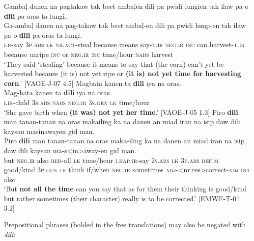 \ea
Gambaļ  danen  na  pagtakaw  tak  beet  ambaļen  dili  pa pwidi  lungien  tak  ilaw  pa  o  \textbf{dili}  pa  oras  ta  lungi. \\\smallskip
\gll Ga-ambaļ  danen  na  pag-takaw  tak  beet  ambaļ-en  dili  pa pwidi  lungi-en  tak  ilaw  pa  o  \textbf{dili}  pa  oras  ta  lungi. \\
\textsc{i.r}-say  3\textsc{p.abs}  \textsc{lk}  \textsc{nr.act}-steal  because  means  say-\textsc{t.ir}  \textsc{neg.ir}  \textsc{inc}
can  harvest-\textsc{t.ir}  because  unripe  \textsc{inc}  or  \textsc{neg.ir}  \textsc{inc}  time/hour  \textsc{nabs}  harvest \\
\glt `They said ‘stealing’ because it means to say that (the corn) can’t yet be harvested because (it is) not yet ripe or \textbf{(it is) not yet time for harvesting corn}.’ [VAOE-J-07 4.5]
\z
\ea
Magbata  kanen  ta  \textbf{dili}  iya  na  oras. \\\smallskip
\gll Mag-bata  kanen  ta  \textbf{dili}  iya  na  oras. \\
\textsc{i.ir}-child  3\textsc{s.abs}  \textsc{nabs}  \textsc{neg.ir}  3\textsc{s.gen}  \textsc{lk}  time/hour \\
\glt ‘She gave birth when \textbf{(it was) not yet her time}.’ [VAOE-J-05 1.3]
\z
\ea
Piro  \textbf{dili}  man  tanan-tanan  na  oras  makailing  ka  na danen  an  miad  iran  na  isip  daw  dili  kaysan masinawayen  gid  man. \\\smallskip
\gll Piro  \textbf{dili}  man  tanan-tanan  na  oras  maka-iling  ka  na danen  an  miad  iran  na  isip  daw  dili  kaysan  ma-s<in>away-en  gid  man. \\
but  \textsc{neg.ir}  also  \textsc{red}-all  \textsc{lk}  time/hour  \textsc{i.hap.ir}-say  2\textsc{s.abs}  \textsc{lk}
3\textsc{p.abs}  \textsc{def.m}  good/kind  3\textsc{p.gen}  \textsc{lk}  think  if/when  \textsc{neg.ir}  sometimes 
\textsc{adj}-\textsc<{nr.res}>correct-\textsc{adj}  \textsc{int}  also \\
\glt `But \textbf{not all the time} can you say that as for them their thinking is good/kind but rather sometimes (their character) really is to be corrected.’ [EMWE-T-01 3.2]
\z

Prepositional phrases (bolded in the free translations) may also be negated with \textit{dili}:

